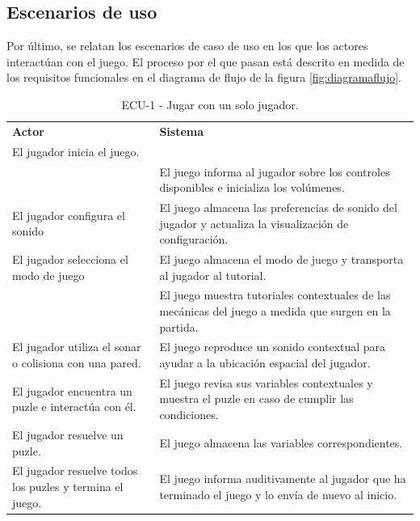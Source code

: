 \subsection{Escenarios de uso}
Por último, se relatan los escenarios de caso de uso en los que los actores interactúan con el juego. El proceso por el que pasan está descrito en medida de los requisitos funcionales en el diagrama de flujo de la figura \ref{fig:diagramaflujo}.
\begin{table}[H]
	\centering
	\caption{ECU-1 - Jugar con un solo jugador.}
	\label{table:ECU1}
	\begin{tabular}{|>{\centering\arraybackslash}p{6cm}|>{\centering\arraybackslash}p{8cm}|}
		\hline
		\multicolumn{2}{|c|}{\textbf{ECU-1 - Jugar con un solo jugador}} \\
		\hline
		\textbf{Actor} & \textbf{Sistema}\\
		\hline
		El jugador inicia el juego. &  \\
		\hline
		  &  El juego informa al jugador sobre los controles disponibles e inicializa los volúmenes.\\
		\hline
		 El jugador configura el sonido &  El juego almacena las preferencias de sonido del jugador y actualiza la visualización de configuración.\\
		\hline
		 El jugador selecciona el modo de juego &  El juego almacena el modo de juego y transporta al jugador al tutorial.\\
		\hline
		 &  El juego muestra tutoriales contextuales de las mecánicas del juego a medida que surgen en la partida.\\
		\hline
		El jugador utiliza el sonar o colisiona con una pared. &  El juego reproduce un sonido contextual para ayudar a la ubicación espacial del jugador.\\
		\hline
		El jugador encuentra un puzle e interactúa con él. &  El juego revisa sus variables contextuales y muestra el puzle en caso de cumplir las condiciones.\\
		\hline
		El jugador resuelve un puzle. &  El juego almacena las variables correspondientes.\\
		\hline
		El jugador resuelve todos los puzles y termina el juego. &  El juego informa auditivamente al jugador que ha terminado el juego y lo envía de nuevo al inicio.\\
		\hline
	\end{tabular}
	
\end{table}
